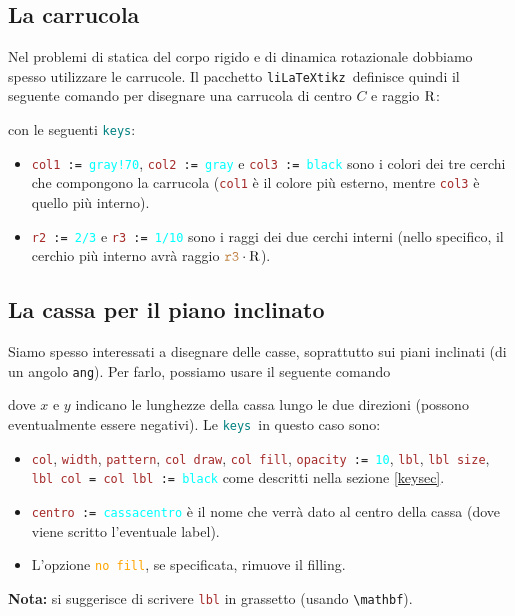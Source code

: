 \documentclass[italian, a4paper]{article}
\newcommand{\bs}{\textbackslash}
\newcommand{\ttt}[1]{\texttt{#1}}
\newcommand{\liLaTeXtikz}{\ttt{liLaTeXtikz}}
\newcommand{\comandons}[2][\large]{\vspace*{1mm}\noindent\fbox{\parbox{\textwidth}{#1\ttt{#2}}}}
\newcommand{\blue}[1]{\textcolor{blue}{#1}}
\newcommand{\cyan}[1]{\textcolor{cyan}{#1}}
\newcommand{\keys}{\textcolor{teal}{\ttt{keys}}}
\newcommand{\key}[1]{\textcolor{brown}{\ttt{#1}}}
\newcommand{\keyop}[1]{\textcolor{orange}{\ttt{#1}}}
\newcommand{\keyval}[1]{\cyan{\ttt{#1}}}
\begin{document}
\subsection{La carrucola}
Nel problemi di statica del corpo rigido e di dinamica rotazionale dobbiamo spesso utilizzare le carrucole. Il pacchetto \liLaTeXtikz\ definisce quindi il seguente comando per disegnare una carrucola di centro $C$ e raggio $\rR$:

\comandons{\bs carrucola[\keys]\{\blue{$C$}\}\{\blue{$\rR$}\};}
con le seguenti \keys:
\begin{itemize}[nolistsep]
\item \ttt{\key{col1} := \keyval{gray!70}}, \ttt{\key{col2} := \keyval{gray}} e \ttt{\key{col3} := \keyval{black}} sono i colori dei tre cerchi che compongono la carrucola (\key{col1} è il colore più esterno, mentre \key{col3} è quello più interno).
\item \ttt{\key{r2} := \keyval{2/3}} e \ttt{\key{r3} := \keyval{1/10}} sono i raggi dei due cerchi interni (nello specifico, il cerchio più interno avrà raggio $\key{r3}\cdot\rR$).
\end{itemize}

\subsection{La cassa per il piano inclinato}
Siamo spesso interessati a disegnare delle casse, soprattutto sui piani inclinati (di un angolo \ttt{ang}). Per farlo, possiamo usare il seguente comando

\comandons{\bs cassa[\keys]\{\blue{punto iniziale}\}\{\blue{$x$}\}\{\blue{$y$}\}\{\blue{ang}\};}
dove $x$ e $y$ indicano le lunghezze della cassa lungo le due direzioni (possono eventualmente essere negativi). Le \keys\ in questo caso sono:
\begin{itemize}[nolistsep]
\item \key{col}, \key{width}, \key{pattern}, \key{col draw}, \key{col fill}, \ttt{\key{opacity} := \keyval{10}}, \key{lbl}, \key{lbl size}, \ttt{\key{lbl col} = \key{col lbl} := \keyval{black}} come descritti nella sezione \ref{keysec}.
\item \ttt{\key{centro} := \keyval{cassacentro}} è il nome che verrà dato al centro della cassa (dove viene scritto l'eventuale label).
\item L'opzione \keyop{no fill}, se specificata, rimuove il filling.
\end{itemize}

\textbf{Nota:} si suggerisce di scrivere \key{lbl} in grassetto (usando \ttt{\bs mathbf}).
\end{document}

